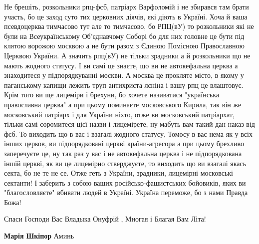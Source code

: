 \begin{itemize}
Не брешіть, розкольники рпц-фсб, патріарх Варфоломій і не збирався там брати
участь, бо це заход суто тих церковних діячів, які діють в Україні. Хоча й ваша
псевдоцерква тимчасово тут але то тимчасово, бо РПЦ(вУ) то розкольники які не
були на Всеукраїнському Об'єднавчому Соборі бо для них головне це бути під
клятою ворожою москвою а не бути разом з Єдиною Помісною Православною Церквою
України. А значить рпц(вУ) не тільки зрадники а й розкольники що не мають
жодного статусу. І ви самі це знаєте, що ви не автокефальна церква а
знаходитеся у підпорядкуванні москви. А москва це прокляте місто, в якому у
паганському капищи лежить труп антихриста лєніна і вашу рпц це влаштовує. Крім
того ви ще лицеміри і брехуни, бо хочете називатися "українська православна
церква" а при цьому поминаєте московського Кирила, так він же московський
патріарх і для України ніхто, отже ви московський патріархат, тільки самі
соромитеся цієї назви і лицемірете, ну мабуть вам такий дан наказ від фсб. То
виходить що в вас і взагалі жодного статусу, Томосу в вас нема як у всіх інших
церков, ви підпорядковані церкві країни-агресора а при цьому брехливо
заперечуєте це, ну так раз у вас і не автокефальна церква і не підпорядкована
іншій церкві, як ви це лицемірно стверджуєте, то виходить що ви взагалі якась
секта, бо не те не се. Отже геть з України, зрадники, лицемірні московські
сектанти! І заберить з собою ваших російсько-фашистських бойовиків, яких ви
"благословляєте" вбивати людей в Україні. Україна переможе, бо з нами Правда
Божа!

 
Спаси Господи Вас Владыка Онуфрій , Многая і Благая Вам Літа!

\begin{itemize}
 
\textbf{Марія Шкіпор} Аминь

 

\end{itemize}
\end{itemize}

